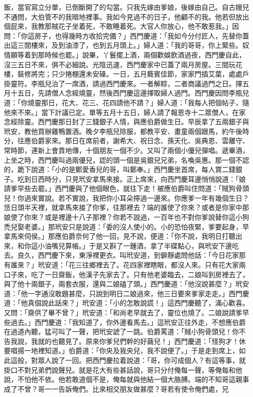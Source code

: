 \begin{showcontents}{}
飯，當官寫立分單，已倒斷開了的勾當。只我先嫁由爹娘，後嫁由自己。自古嫂兒不通問，大伯管不的我暗地裡事。我如今見過不的日子，他顧不的我。他若但放出個屁來，我教那賊花子坐着死，不敢睡着死。大官人你放心，他不敢惹我。」因問：「你這房子，也得幾時方收拾完備？」西門慶道：「我如今分付匠人，先替你蓋出這三間樓來，及到油漆了，也到五月頭上。」婦人道：「我的哥哥，你上緊些。奴情願等着到那時候也罷。」說畢，丫鬟擺上酒，兩個歡娛飲酒過夜，西門慶自此，沒三五日不來，俱不必細說。光陰迅速，西門慶家中已蓋了兩月房屋。三間玩花樓，裝修將完；只少捲棚還未安磉。一日，五月蕤賓佳節，家家門插艾葉，處處戶掛靈符。李瓶兒治了一席酒，請過西門慶來。一者解粽，二者商議過門之日。擇五月十五日，先請僧人念經燒靈，然後西門慶這邊擇取婦人過門。西門慶因問李瓶兒道：「你燒靈那日，花大、花三、花四請他不請？」婦人道：「我每人把個帖子，隨他來不來。」當下計議已定。單等五月十五日，婦人請了報恩寺十二眾僧人，在家念經除靈。西門慶那日封了三錢銀子人情，與應伯爵做生日。早辰拿了五兩銀子與玳安，教他買辦雞鴨置酒。晚夕李瓶兒除服，都教平安、畫童兩個跟馬，約午後時分，往應伯爵家來。那日在席前者，謝希大、祝日念、孫天化、吳典恩、雲離守、常時節，連新上會賁地傳，十個朋友一個不少。又叫了兩個小優兒彈唱。遞畢酒，上坐之時，西門慶叫過兩優兒，認的頭一個是吳銀兒兄弟，名喚吳惠。那一個不認的，跪下說道：「小的是鄭愛香兒的哥，叫鄭奉。」西門慶坐首席，每人賞二錢銀子。吃到日西時分，只見玳安拿馬來接。正上席來，向西門慶耳邊悄悄說道：「娘請爹早些去罷。」西門慶與了他個眼色，就往下走！被應伯爵叫住問道：「賊狗骨頭兒！你過來實說。若不實說，我把你小耳朵擰過一邊來。你應爹一年有幾個生日？恁日頭半天裡，就拿馬來接了你爹，往那裡去？端的誰使了你來？或者是你家中那娘使了你來？或是裡邊十八子那裡？你若不說過，一百年也不對你爹說替你這小狗禿兒娶老婆。」那玳安只是說道：「委的沒人使小的。小的恐怕夜緊，爹要起身，早拿馬來伺侯。」那應伯爵奈何了他一回，見不說，便道：「你不說，我明日打聽出來，和你這小油嘴兒算帳。」于是又斟了一鍾酒，拿了半碟點心，與玳安下邊吃去。良久，西門慶下來，東淨裡更衣。叫玳安道，到僻靜處問他話：「今日花家那有誰來？」玳安道：「花三往鄉裡去了。花四家裡瞎眼，都沒人來。只有花大家兩口子來，吃了一日齋飯，他漢子先家去了。只有他老婆臨去，二娘叫到房裡去了，與了他十兩銀子，兩套衣服，還與二娘磕了頭。」西門慶道：「他沒說甚麼？」玳安道：「他一字通沒敢題甚麼，只說到明日二娘過來，他三日要來爹家走走。」西門慶道：「他真個說此話來？」玳安道：「小的怎敢說謊！」這西門慶聽了，滿心歡喜。又問：「齋供了畢不曾？」玳安道：「和尚老早就去了，靈位也燒了。二娘說請爹早些過去。」西門慶道：「我知道了，你外邊看馬去。」這玳安正往外走，不想應伯爵在過道內聽，猛可叫了一聲，把玳安諕了一跳。伯爵罵道：「賊小狗骨頭兒！你不告我說，我就的也聽見了。原來你爹兒們幹的好繭兒！」西門慶道：「怪狗才！休要唱揚一地裡知道。」伯爵道：「你央及我央兒，我不說便了。」于是走到席上，如此這般，對眾人說了一回。把西門慶拉着說道：「哥，你可成個人？有這等事，就掛口不對兄弟們說聲兒。就是花大有些甚話說，哥只分付俺每一聲，等俺每和他說，不怕他不依。他若敢道個不是，俺每就與他結一個大胳膊。端的不知哥這親事成了不曾？哥一一告訴俺們。比來相交朋友做甚麼？哥若有使令俺們處，兄
\end{showcontents}
